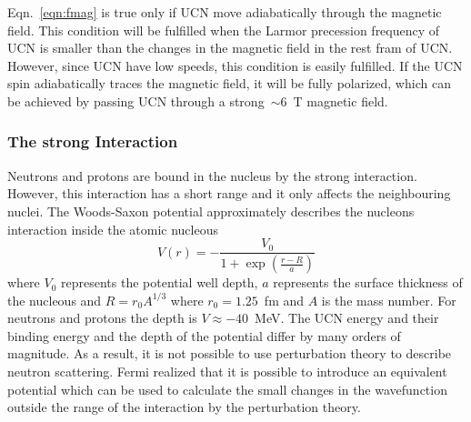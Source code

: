 Eqn.~\ref{eqn:fmag} is true only if UCN move adiabatically through the
magnetic field. This condition will be fulfilled when the Larmor
precession frequency of UCN is smaller than the changes in the
magnetic field in the rest fram of UCN. However, since UCN have low
speeds, this condition is easily fulfilled.  If the UCN spin
adiabatically traces the magnetic field, it will be fully polarized,
which can be achieved by passing UCN through a strong~$\sim 6$~T
magnetic field.




\subsubsection{The strong Interaction}
Neutrons and protons are bound in the nucleus by the strong
interaction. However, this interaction has a short range and it only
affects the neighbouring nuclei.
The Woods-Saxon potential approximately
describes the nucleons interaction inside the atomic nucleous
\begin{equation}
  \label{eqn:woodsax}
  V(r) = - \frac{V_0}{1+\exp(\frac{r-R}{a})}
\end{equation}
where $V_0$ represents the potential well depth, $a$ represents the
surface thickness of the nucleous and $R = r_0 A^{1/3}$ where
$r_0 = 1.25$~fm and $A$ is the mass number. For neutrons and protons
the depth is $V \approx -40$~MeV. The UCN energy and their binding
energy and the depth of the potential differ by many orders of
magnitude. As a result, it is not possible to use perturbation theory
to describe neutron scattering. Fermi realized that it is possible to
introduce an equivalent potential which can be used to calculate the
small changes in the wavefunction outside the range of the interaction
by the perturbation theory.

